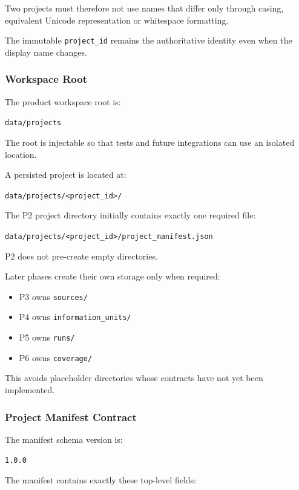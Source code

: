 Two projects must therefore not use names that differ only through casing, equivalent Unicode representation or whitespace formatting.

The immutable \texttt{project\_id} remains the authoritative identity even when the display name changes.

\hypertarget{workspace-root}{%
\subsubsection{Workspace Root}\label{workspace-root}}

The product workspace root is:

\texttt{data/projects}

The root is injectable so that tests and future integrations can use an isolated location.

A persisted project is located at:

\texttt{data/projects/\textless{}project\_id\textgreater{}/}

The P2 project directory initially contains exactly one required file:

\texttt{data/projects/\textless{}project\_id\textgreater{}/project\_manifest.json}

P2 does not pre-create empty directories.

Later phases create their own storage only when required:

\begin{itemize}
\tightlist
\item
  P3 owns \texttt{sources/}
\item
  P4 owns \texttt{information\_units/}
\item
  P5 owns \texttt{runs/}
\item
  P6 owns \texttt{coverage/}
\end{itemize}

This avoids placeholder directories whose contracts have not yet been implemented.

\hypertarget{project-manifest-contract}{%
\subsubsection{Project Manifest Contract}\label{project-manifest-contract}}

The manifest schema version is:

\texttt{1.0.0}

The manifest contains exactly these top-level fields:

